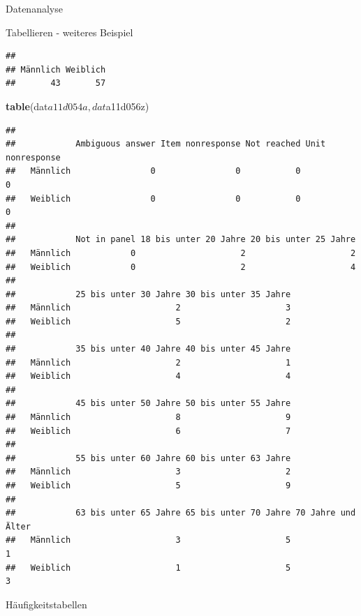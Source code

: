\documentclass[ignorenonframetext,]{beamer}
\newenvironment{Shaded}{}{}
\newcommand{\KeywordTok}[1]{\textcolor[rgb]{0.00,0.44,0.13}{\textbf{{#1}}}}
\newcommand{\NormalTok}[1]{{#1}}
\begin{document}
\begin{frame}[fragile]{Datenanalyse}
\begin{block}{Tabellieren - weiteres Beispiel}
\begin{Shaded}
\end{Shaded}

\begin{verbatim}
## 
## Männlich Weiblich 
##       43       57
\end{verbatim}

\begin{Shaded}
\begin{Highlighting}[]
\KeywordTok{table}\NormalTok{(dat$a11d054a,dat$a11d056z)}
\end{Highlighting}
\end{Shaded}

\begin{verbatim}
##           
##            Ambiguous answer Item nonresponse Not reached Unit nonresponse
##   Männlich                0                0           0                0
##   Weiblich                0                0           0                0
##           
##            Not in panel 18 bis unter 20 Jahre 20 bis unter 25 Jahre
##   Männlich            0                     2                     2
##   Weiblich            0                     2                     4
##           
##            25 bis unter 30 Jahre 30 bis unter 35 Jahre
##   Männlich                     2                     3
##   Weiblich                     5                     2
##           
##            35 bis unter 40 Jahre 40 bis unter 45 Jahre
##   Männlich                     2                     1
##   Weiblich                     4                     4
##           
##            45 bis unter 50 Jahre 50 bis unter 55 Jahre
##   Männlich                     8                     9
##   Weiblich                     6                     7
##           
##            55 bis unter 60 Jahre 60 bis unter 63 Jahre
##   Männlich                     3                     2
##   Weiblich                     5                     9
##           
##            63 bis unter 65 Jahre 65 bis unter 70 Jahre 70 Jahre und Älter
##   Männlich                     3                     5                  1
##   Weiblich                     1                     5                  3
\end{verbatim}

\end{block}

\begin{block}{Häufigkeitstabellen}


\end{block}
\end{frame}
\end{document}
